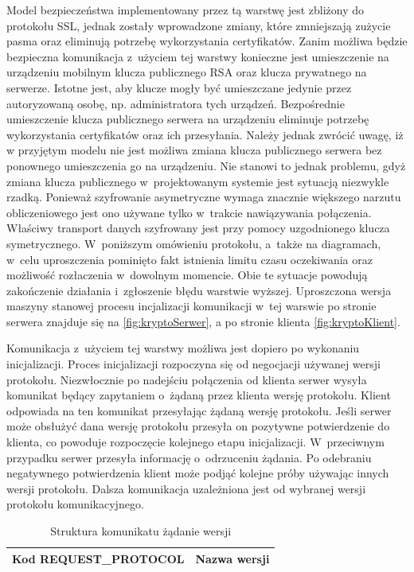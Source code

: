 Model bezpieczeństwa implementowany przez tą warstwę jest zbliżony do
protokołu SSL, jednak zostały wprowadzone zmiany, które zmniejszają
zużycie pasma oraz eliminują potrzebę wykorzystania
certyfikatów. Zanim możliwa będzie bezpieczna komunikacja z~użyciem
tej warstwy konieczne jest umieszczenie na urządzeniu mobilnym klucza
publicznego RSA oraz klucza prywatnego na serwerze. Istotne jest, aby
klucze mogły być umieszczane jedynie przez autoryzowaną osobę,
np. administratora tych urządzeń. Bezpośrednie umieszczenie klucza
publicznego serwera na urządzeniu eliminuje potrzebę wykorzystania
certyfikatów oraz ich przesyłania. Należy jednak zwrócić uwagę, iż w
przyjętym modelu nie jest możliwa zmiana klucza publicznego serwera
bez ponownego umieszczenia go na urządzeniu. Nie stanowi to jednak
problemu, gdyż zmiana klucza publicznego w~projektowanym systemie jest
sytuacją niezwykle rzadką. Ponieważ szyfrowanie asymetryczne wymaga
znacznie większego narzutu obliczeniowego jest ono używane tylko
w~trakcie nawiązywania połączenia. Właściwy transport danych
szyfrowany jest przy pomocy uzgodnionego klucza
symetrycznego. W~poniższym omówieniu protokołu, a~także na diagramach,
w~celu uproszczenia pominięto fakt istnienia limitu czasu oczekiwania
oraz możliwość rozłaczenia w~dowolnym momencie. Obie te sytuacje
powodują zakończenie działania i~zgłoszenie błędu warstwie
wyższej. Uproszczona wersja maszyny stanowej procesu incjalizacji
komunikacji w~tej warswie po stronie serwera znajduje się na
\ref{fig:kryptoSerwer}, a po stronie klienta \ref{fig:kryptoKlient}.

Komunikacja z~użyciem tej warstwy możliwa jest dopiero po wykonaniu
inicjalizacji. Proces inicjalizacji rozpoczyna się od negocjacji
używanej wersji protokołu. Niezwłocznie po nadejściu połączenia od
klienta serwer wysyła komunikat będący zapytaniem o~żądaną przez
klienta wersję protokołu. Klient odpowiada na ten komunikat
przesyłając żądaną wersję protokołu. Jeśli serwer może obsłużyć dana
wersję protokołu przesyła on pozytywne potwierdzenie do klienta, co
powoduje rozpoczęcie kolejnego etapu inicjalizacji. W~przeciwnym
przypadku serwer przesyła informację o~odrzuceniu żądania. Po
odebraniu negatywnego potwierdzenia klient może podjąć kolejne próby
używając innych wersji protokołu. Dalsza komunikacja uzależniona jest
od wybranej wersji protokołu komunikacyjnego.

\begin{table}[H]
\centering
\caption{Struktura komunikatu żądanie wersji}

\begin{tabular}{|p{5cm}|p{6cm}|}
\hline
\raggedright{Kod REQUEST\_PROTOCOL} & Nazwa wersji\\
\hline
\end{tabular}
\end{table}

